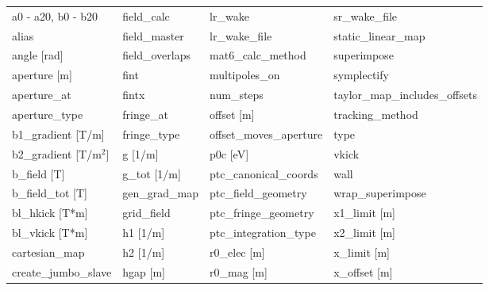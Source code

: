 \begin{tabular}{llll} \toprule
a0 - a20, b0 - b20               & field_calc                       & lr_wake                          & sr_wake_file                     \\
alias                            & field_master                     & lr_wake_file                     & static_linear_map                \\
angle [rad]                      & field_overlaps                   & mat6_calc_method                 & superimpose                      \\
aperture [m]                     & fint                             & multipoles_on                    & symplectify                      \\
aperture_at                      & fintx                            & num_steps                        & taylor_map_includes_offsets      \\
aperture_type                    & fringe_at                        & offset [m]                       & tracking_method                  \\
b1_gradient [T/m]                & fringe_type                      & offset_moves_aperture            & type                             \\
b2_gradient [T/m$^2$]            & g [1/m]                          & p0c [eV]                         & vkick                            \\
b_field [T]                      & g_tot [1/m]                      & ptc_canonical_coords             & wall                             \\
b_field_tot [T]                  & gen_grad_map                     & ptc_field_geometry               & wrap_superimpose                 \\
bl_hkick [T*m]                   & grid_field                       & ptc_fringe_geometry              & x1_limit [m]                     \\
bl_vkick [T*m]                   & h1 [1/m]                         & ptc_integration_type             & x2_limit [m]                     \\
cartesian_map                    & h2 [1/m]                         & r0_elec [m]                      & x_limit [m]                      \\
create_jumbo_slave               & hgap [m]                         & r0_mag [m]                       & x_offset [m]                     \\

\end{tabular}
